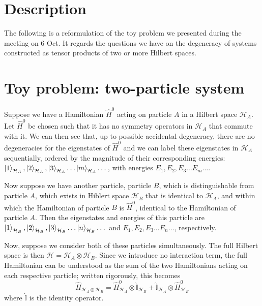 \documentclass[12pt]{article}
\begin{document}
	\section{Description}
	
	The following is a reformulation of the toy problem we presented during the meeting on 6 Oct. It regards the questions we have on the degeneracy of systems constructed as tensor products of two or more Hilbert spaces.
	
	\section{Toy problem: two-particle system}
	
	Suppose we have a Hamiltonian $\hat{H}^0$ acting on particle $A$ in a Hilbert space $\mathcal{H}_A$. Let $\hat{H}^0$ be chosen such that it has no symmetry operators in $\mathcal{H}_A$ that commute with it. We can then see that, up to possible accidental degeneracy, there are no degeneracies for the eigenstates of $\hat{H}^0$ and we can label these eigenstates in $\mathcal{H}_A$ sequentially, ordered by the magnitude of their corresponding energies: $\ket{1}_{\mathcal{H}_A}, \ket{2}_{\mathcal{H}_A}, \ket{3}_{\mathcal{H}_A}\dots \ket{m}_{\mathcal{H}_A}\dots$, with energies $E_1, E_2, E_3 \dots E_m \dots$.
	
	Now suppose we have another particle, particle $B$, which is distinguishable from particle $A$, which exists in Hiblert space $\mathcal{H}_B$ that is identical to $\mathcal{H}_A$, and within which the Hamiltonian of particle $B$ is $\hat{H}^0$, identical to the Hamiltonian of particle $A$. Then the eigenstates and energies of this particle are $\ket{1}_{\mathcal{H}_B}, \ket{2}_{\mathcal{H}_B}, \ket{3}_{\mathcal{H}_B}\dots \ket{n}_{\mathcal{H}_B}\dots$ and $E_1, E_2, E_3 \dots E_n \dots$, respectively.
	
	Now, suppose we consider both of these particles simultaneously. The full Hilbert space is then $\mathcal{H}=\mathcal{H}_A\otimes\mathcal{H}_B$. Since we introduce no interaction term, the full Hamiltonian can be understood as the sum of the two Hamiltonians acting on each respective particle; written rigorously, this becomes
	$$\hat{H}_{\mathcal{H}_A\otimes\mathcal{H}_B}=\hat{H}^0_{\mathcal{H}_A} \otimes \hat{\mathbb{I}}_{\mathcal{H}_B}+\hat{\mathbb{I}}_{\mathcal{H}_A} \otimes \hat{H}^0_{\mathcal{H}_B}$$
	where $\hat{\mathbb{I}}$ is the identity operator.
	
\end{document}
